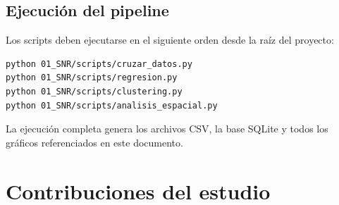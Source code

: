 \documentclass{article}
\begin{document}
\subsection{Ejecución del pipeline}

Los scripts deben ejecutarse en el siguiente orden desde la raíz del
proyecto:

\begin{verbatim}
python 01_SNR/scripts/cruzar_datos.py
python 01_SNR/scripts/regresion.py
python 01_SNR/scripts/clustering.py
python 01_SNR/scripts/analisis_espacial.py
\end{verbatim}

La ejecución completa genera los archivos CSV, la base SQLite y todos
los gráficos referenciados en este documento.

\newpage
\section{Contribuciones del estudio}
\end{document}
